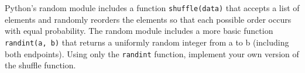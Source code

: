  \label{sssec:ex1_20}

Python's random module includes a function \texttt{shuffle(data)} that accepts a list of elements and randomly reorders the elements so that each possible order occurs with equal probability. The random module includes a more basic function \texttt{randint(a, b)} that returns a uniformly random integer from a to b (including both endpoints). Using only the \texttt{randint} function, implement your own version of the shuffle function.


